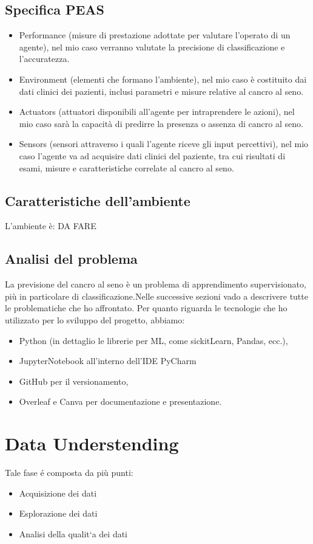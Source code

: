 \documentclass{article}
\begin{document}
\subsection{Specifica PEAS}
\begin{itemize}
    \item Performance (misure di prestazione adottate per valutare l’operato di un agente), nel mio caso
    verranno valutate la precisione di classificazione e l’accuratezza.
    \item Environment (elementi che formano l’ambiente), nel mio caso è costituito dai dati clinici dei pazienti, inclusi parametri e misure relative al cancro al seno.
    \item Actuators (attuatori disponibili all’agente per intraprendere le azioni), nel mio caso sarà la capacità di predirre la presenza o assenza di cancro al seno.
    \item Sensors (sensori attraverso i quali l’agente riceve gli input percettivi), nel mio caso l’agente va ad acquisire dati clinici del paziente, tra cui risultati di esami, misure e caratteristiche correlate al cancro al seno.
\end{itemize}

\subsection{Caratteristiche dell'ambiente}
L'ambiente è:
DA FARE


\subsection{Analisi del problema}
La previsione del cancro al seno è un problema di apprendimento supervisionato, più in particolare di classificazione.Nelle successive sezioni vado a descrivere tutte le problematiche che ho affrontato.
Per quanto riguarda le tecnologie che ho utilizzato per lo sviluppo del progetto, abbiamo:
\begin{itemize}
    \item Python (in dettaglio le librerie per ML, come sickitLearn, Pandas, ecc.),
    \item JupyterNotebook all’interno dell’IDE PyCharm
    \item GitHub per il versionamento,
    \item Overleaf e Canva per documentazione e presentazione.
\end{itemize}

\newpage
\section{Data Understending}
Tale fase é composta da più punti:
\begin{itemize}
    \item Acquisizione dei dati
    \item Esplorazione dei dati
    \item Analisi della qualit`a dei dati
\end{itemize}
\end{document}
